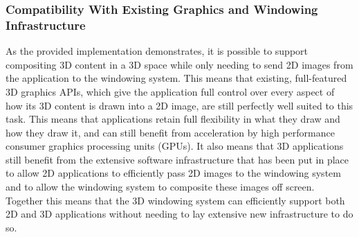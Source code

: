 \subsubsection{Compatibility With Existing Graphics and Windowing Infrastructure}

	As the provided implementation demonstrates, it is possible to support compositing 3D content in a 3D space while only needing to send 2D images from the application to the windowing system. This means that existing, full-featured 3D graphics APIs, which give the application full control over every aspect of how its 3D content is drawn into a 2D image, are still perfectly well suited to this task. This means that applications retain full flexibility in what they draw and how they draw it, and can still benefit from acceleration by high performance consumer graphics processing units (GPUs). It also means that 3D applications still benefit from the extensive software infrastructure that has been put in place to allow 2D applications to efficiently pass 2D images to the windowing system and to allow the windowing system to composite these images off screen. Together this means that the 3D windowing system can efficiently support both 2D and 3D applications without needing to lay extensive new infrastructure to do so.
